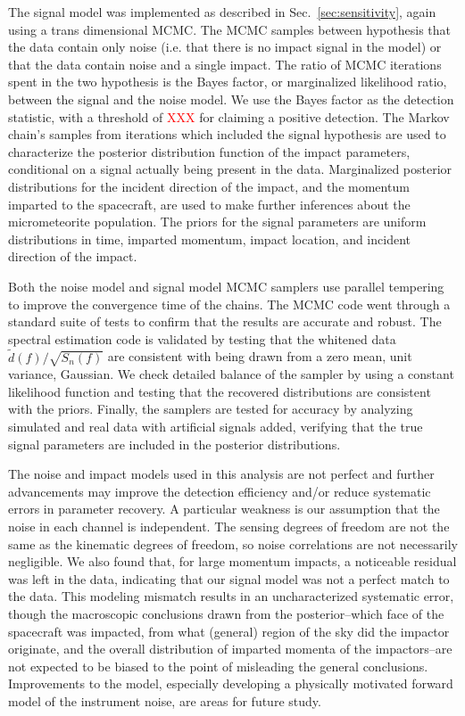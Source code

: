 \documentclass[twocolumn, trackchanges]{aastex62}
\newcommand{\red}[1]{\textcolor{red}{#1}}
\newcommand{\data}{\tilde d}
\begin{document}
The signal model was implemented as described in Sec.~\ref{sec:sensitivity}, again using a trans dimensional MCMC.
The MCMC samples between hypothesis that the data contain only noise (i.e. that there is no impact signal in the model) or that the data contain noise and a single impact.
The ratio of MCMC iterations spent in the two hypothesis is the Bayes factor, or marginalized likelihood ratio, between the signal and the noise model.
We use the Bayes factor as the detection statistic, with a threshold of \red{XXX} for claiming a positive detection.
The Markov chain's samples from iterations which included the signal hypothesis are used to characterize the posterior distribution function of the impact parameters, conditional on a signal actually being present in the data.
Marginalized posterior distributions for the incident direction of the impact, and the momentum imparted to the spacecraft, are used to make further inferences about the micrometeorite population.
The priors for the signal parameters are uniform distributions in time, imparted momentum, impact location, and incident direction of the impact.  

Both the noise model and signal model MCMC samplers use parallel tempering to improve the convergence time of the chains.
The MCMC code went through a standard suite of tests to confirm that the results are accurate and robust.
The spectral estimation code is validated by testing that the whitened data $\data(f)/\sqrt{S_n(f)}$ are consistent with being drawn from a zero mean, unit variance, Gaussian.
We check detailed balance of the sampler by using a constant likelihood function and testing that the recovered distributions are consistent with the priors.
Finally, the samplers are tested for accuracy by analyzing simulated and real data with artificial signals added, verifying that the true signal parameters are included in the posterior distributions.
 
The noise and impact models used in this analysis are not perfect and further advancements may improve the detection efficiency and/or reduce systematic errors in parameter recovery.
A particular weakness is our assumption that the noise in each channel is independent. 
The sensing degrees of freedom are not the same as the kinematic degrees of freedom, so noise correlations are not necessarily negligible. 
We also found that, for large momentum impacts, a noticeable residual was left in the data, indicating that our signal model was not a perfect match to the data. 
This modeling mismatch results in an uncharacterized systematic error, though the macroscopic conclusions drawn from the posterior--which face of the spacecraft was impacted, from what (general) region of the sky did the impactor originate, and the overall distribution of imparted momenta of the impactors--are not expected to be biased to the point of misleading the general conclusions.
Improvements to the model, especially developing a physically motivated forward model of the instrument noise, are areas for future study.
\end{document}
